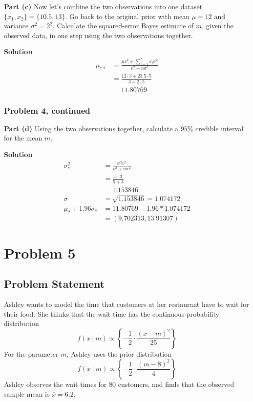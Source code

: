 \documentclass[12pt]{article}
\theoremstyle{definition}
\begin{document}
\noindent
{\bf Part (c)} Now let's combine the two observations into one dataset $\{x_1, x_2\} = \{10.5, 13\}$. Go back to the original prior with mean $\mu = 12$ and variance $\sigma^2 = 2^2$. Calculate the squared-error Bayes estimate of $m$, given the observed data, in one step using the two observations together.

\bigskip
\noindent
{\bf Solution} 
\begin{align*}
\mu_{**} &= \frac{\mu v^2 + \sum_{i=1}^n x_i \sigma^2}{v^2 + n\sigma^2}\\
&= \frac{12 \cdot 3 + 23.5\cdot 5}{3 + 2 \cdot 5}\\
&= 11.80769
\end{align*}

\newpage
\subsubsection*{Problem 4, continued}

\noindent
{\bf Part (d)} Using the two observations together, calculate a 95\% credible interval for the mean $m$.

\bigskip
\noindent
{\bf Solution} 
\begin{align*}
\sigma^2_{*} &= \frac{\sigma^2 v^2}{v^2 + n\sigma^2}\\
&= \frac{5 \cdot 3}{5 + 3}\\
&= 1.153846\\
\sigma &= \sqrt{1.153846} = 1.074172\\
\mu_{*} \pm 1.96\sigma_{*} &= 11.80769 - 1.96 * 1.074172\\
&= (9.702313, 13.91307)
\end{align*}


\newpage
\section*{Problem 5}

\subsection*{Problem Statement}

Ashley wants to model the time that customers at her restaurant have to wait for their food. She thinks that the wait time has the continuous probability distribution
$$
f(x\ |\ m) \propto \left \{ - \frac{1}{2} \cdot \frac{ (x - m)^2}{25} \right \}
$$
For the parameter $m$, Ashley uses the prior distribution
$$
f(x\ |\ m) \propto \left \{ - \frac{1}{2} \cdot \frac{ (m - 8)^2}{4} \right \}
$$
Ashley observes the wait times for 80 customers, and finds that the observed sample mean is $\overline{x} = 6.2$.
\end{document}
